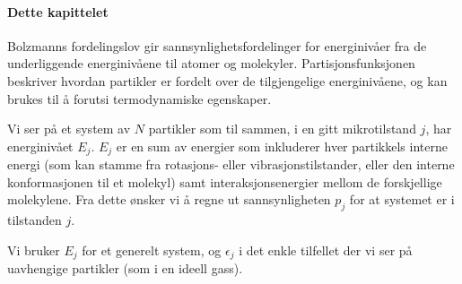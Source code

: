 \paragraph{Dette kapittelet}
Bolzmanns fordelingslov gir sannsynlighetsfordelinger for energinivåer fra de underliggende energinivåene til atomer og molekyler. Partisjonsfunksjonen beskriver hvordan partikler er fordelt over de tilgjengelige energinivåene, og kan brukes til å forutsi termodynamiske egenskaper. 

Vi ser på et system av $N$ partikler som til sammen, i en gitt mikrotilstand $j$, har energinivået $E_j$. $E_j$ er en sum av energier som inkluderer hver partikkels interne energi (som kan stamme fra rotasjons- eller vibrasjonstilstander, eller den interne konformasjonen til et molekyl) samt interaksjonsenergier mellom de forskjellige molekylene. Fra dette ønsker vi å regne ut sannsynligheten $p_j$ for at systemet er i tilstanden $j$.

Vi bruker $E_j$ for et generelt system, og $\epsilon_j$ i det enkle tilfellet der vi ser på uavhengige partikler (som i en ideell gass).

